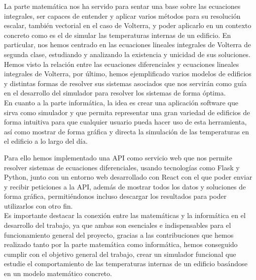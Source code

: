 La parte matemática nos ha servido para sentar una base sobre las ecuaciones integrales, ser capaces de entender y aplicar varios métodos para su resolución escalar, también vectorial en el caso de Volterra, y poder aplicarlo en un contexto concreto como es el de simular las temperaturas internas de un edificio. En particular, nos hemos centrado en las ecuaciones lineales integrales de Volterra de segunda clase, estudiando y analizando la existencia y unicidad de sus soluciones. Hemos visto la relación entre las ecuaciones diferenciales y ecuaciones lineales integrales de Volterra, por último, hemos ejemplificado varios modelos de edificios y distintas formas de resolver sus sistemas asociados que nos servirán como guía en el desarrollo del simulador para resolver los sistemas de forma óptima.\\

En cuanto a la parte informática, la idea es crear una aplicación software que sirva como simulador y que permita representar una gran variedad de edificios de forma intuitiva para que cualquier usuario pueda hacer uso de esta herramienta, así como mostrar de forma gráfica y directa la simulación de las temperaturas en el edificio a lo largo del día.

Para ello hemos implementado una API como servicio web que nos permite resolver sistemas de ecuaciones diferenciales, usando tecnologías como Flask y Python, junto con un entorno web desarrollado con React con el que poder enviar y recibir peticiones a la API, además de mostrar todos los datos y soluciones de forma gráfica, permitiéndonos incluso descargar los resultados para poder utilizarlos con otro fin.\\

Es importante destacar la conexión entre las matemáticas y la informática en el desarrollo del trabajo, ya que ambas son esenciales e indispensables para el funcionamiento general del proyecto, gracias a las contribuciones que hemos realizado tanto por la parte matemática como informática, hemos conseguido cumplir con el objetivo general del trabajo, crear un simulador funcional que estudie el comportamiento de las temperaturas internas de un edificio basándose en un modelo matemático concreto.
